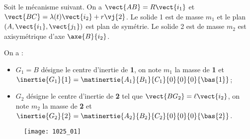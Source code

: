\normaltrue
\correctionfalse


\setcounter{question}{0}%



\ifcorrection
\else
{}
\fi

\ifprof
\else
Soit le mécanisme suivant. On a $\vect{AB}=R\vect{i_1}$ et $\vect{BC}=\lambda(t)\vect{i_2}+r\vj{2}$. Le solide 1 est de masse $m_1$ et le plan $\left(A,\vect{i_1},\vect{j_1}\right)$ est plan de symétrie. Le solide 2 est de masse $m_2$ est axisymétrique d'axe $\axe{B}{i_2}$.

On a :
\begin{itemize}
\item $G_1=B$ désigne le centre d'inertie de \textbf{1}, on note $m_1$ la masse de \textbf{1} et $\inertie{G_1}{1}=\matinertie{A_1}{B_1}{C_1}{0}{0}{0}{\bas{1}}$; 
\item $G_2$ désigne le centre d'inertie de \textbf{2} tel que  $\vect{BG_2}=\ell\vect{i_2}$, on note $m_2$ la masse de \textbf{2} et $\inertie{G_2}{2}=\matinertie{A_2}{B_2}{C_2}{0}{0}{0}{\bas{2}}$.
\end{itemize}

\begin{figure}[H]
\texttt{[image: 1025\_01]}
\end{figure}
\fi

\ifprof~\\
\else
\fi

\ifprof~\\
\else
\fi

\ifprof~\\
\else
\fi

\ifcolle
{}
\ifprof~\\
\else
\fi
\else
\fi

\ifprof
\else
{}
\fi